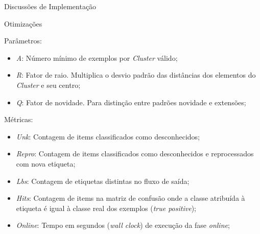 \documentclass[aspectratio=43,10pt]{beamer}
\begin{document}
\begin{frame}[fragile]{Discussões de Implementação}
  \begin{alertblock}{Otimizações}

    Parâmetros:
    \footnotesize{
      \begin{itemize}%
      \item \textit{A}: Número mínimo de exemplos por \textit{Cluster} válido;
      \item \textit{R}: Fator de raio. Multiplica o desvio padrão das distâncias dos elementos do \textit{Cluster} e seu centro;
      \item \textit{Q}: Fator de novidade. Para distinção entre padrões novidade e extensões;
    \end{itemize}}

    \normalsize{Métricas:}
    \footnotesize{\begin{itemize}%
      \item \textit{Unk}: Contagem de items classificados como desconhecidos;
      \item \textit{Repro}: Contagem de items classificados como desconhecidos e reprocessados com nova etiqueta;
      \item \textit{Lbs}: Contagem de etiquetas distintas no fluxo de saída;
      \item \textit{Hits}: Contagem de items na matriz de confusão onde a classe atribuída à etiqueta é igual à classe real dos exemplos (\textit{true positive});
      \item \textit{Online}: Tempo em segundos (\textit{wall clock}) de execução da fase \textit{online};
    \end{itemize}}
  \end{alertblock}
\end{frame}
\end{document}
